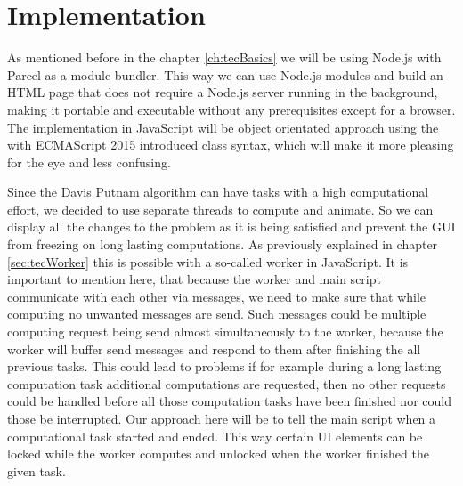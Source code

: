 
\chapter{Implementation}
\label{ch:implementation}
As mentioned before in the chapter \ref{ch:tecBasics} we will be using Node.js with Parcel as a module bundler. This way we can use Node.js modules and build an HTML page that does not require a Node.js server running in the background, making it portable and executable without any prerequisites except for a browser. The implementation in JavaScript will be object orientated approach using the with ECMAScript 2015 introduced class syntax, which will make it more pleasing for the eye and less confusing.

Since the Davis Putnam algorithm can have tasks with a high computational effort, we decided to use separate threads to compute and animate. So we can display all the changes to the problem as it is being satisfied and prevent the GUI from freezing on long lasting computations. As previously explained in chapter \ref{sec:tecWorker} this is possible with a so-called worker in JavaScript. It is important to mention here, that because the worker and main script communicate with each other via messages, we need to make sure that while computing no unwanted messages are send. Such messages could be multiple computing request being send almost simultaneously to the worker, because the worker will buffer send messages and respond to them after finishing the all previous tasks. This could lead to problems if for example during a long lasting computation task additional computations are requested, then no other requests could be handled before all those computation tasks have been finished nor could those be interrupted. Our approach here will be to tell the main script when a computational task started and ended. This way certain UI elements can be locked while the worker computes and unlocked when the worker finished the given task.

